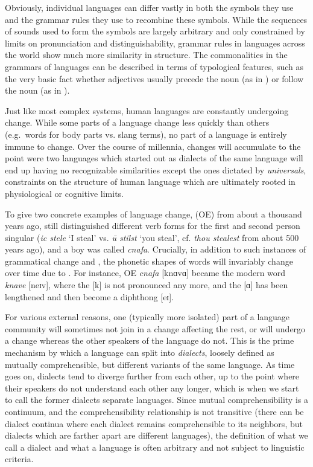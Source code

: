 \newpage 
Obviously, individual languages can differ vastly in both the symbols they use and the grammar rules they use to recombine these symbols. While the sequences of sounds used to form the symbols are largely arbitrary and only constrained by limits on pronunciation and distinguishability, grammar rules in languages across the world show much more similarity in structure. The commonalities in the grammars of languages can be described in terms of typological features, such as the very basic fact whether adjectives usually precede the noun (as in ) or follow the noun (as in ).

Just like most complex systems, human languages are constantly undergoing change. While some parts of a language change less quickly than others (e.g.\ words for body parts vs. slang terms), no part of a language is entirely immune to change. Over the course of millennia, changes will accumulate to the point were two languages which started out as dialects of the same language will end up having no recognizable similarities except the ones dictated by \textit{universals}, constraints on the structure of human language which are ultimately rooted in physiological or cognitive limits.

To give two concrete examples of language change,  (OE) from about a thousand years ago, still distinguished different verb forms for the first and second person singular (\textit{ic stele} `I steal' vs. \textit{\th{}\={u} stilst} `you steal', cf. \textit{thou stealest} from about 500 years ago), and a boy was called \textit{cnafa}. Crucially, in addition to such instances of grammatical change and , the phonetic shapes of words will invariably change over time due to . For instance, OE \textit{cnafa} [knɑvɑ] became the modern word \textit{knave} [neɪv], where the [k] is not pronounced any more, and the [ɑ] has been lengthened and then become a diphthong [eɪ].

For various external reasons, one (typically more isolated) part of a language community will sometimes not join in a change affecting the rest, or will undergo a change whereas the other speakers of the language do not. This is the prime mechanism by which a language can split into \textit{dialects}, loosely defined as mutually comprehensible, but different variants of the same language. As time goes on, dialects tend to diverge further from each other, up to the point where their speakers do not understand each other any longer, which is when we start to call the former dialects separate languages. Since mutual comprehensibility is a continuum, and the comprehensibility relationship is not transitive (there can be dialect continua where each dialect remains comprehensible to its neighbors, but dialects which are farther apart are different languages), the definition of what we call a dialect and what a language is often arbitrary and not subject to linguistic criteria.

